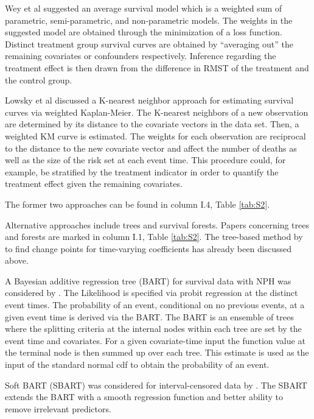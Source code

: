 \noindent 


\noindent Wey et al \cite{Wey.2016} suggested an average survival model which is a weighted sum of parametric, semi-parametric, and non-parametric models. The weights in the suggested model are obtained through the minimization of a loss function. Distinct treatment group survival curves are obtained by ``averaging out'' the remaining covariates or confounders respectively. Inference regarding the treatment effect is then drawn from the difference in RMST of the treatment and the control group.

\noindent Lowsky et al \cite{Lowsky.2013} discussed a K-nearest neighbor approach for estimating survival curves via weighted Kaplan-Meier. The K-nearest neighbors of a new observation are determined by its distance to the covariate vectors in the data set. Then, a weighted KM curve is estimated. The weights for each observation are reciprocal to the distance to the new covariate vector and affect the number of deaths as well as the size of the risk set at each event time. This procedure could, for example, be stratified by the treatment indicator in order to quantify the treatment effect given the remaining covariates.

\noindent The former two approaches can be found in column I.4, Table \ref{tab:S2}.

\noindent Alternative approaches include trees and survival forests. Papers concerning trees and forests are marked in column I.1, Table \ref{tab:S2}. The tree-based method by \cite{Xu.2002} to find change points for time-varying coefficients has already been discussed above. 

\noindent A Bayesian additive regression tree (BART) for survival data with NPH was considered by \cite{Sparapani.2016}. The Likelihood is specified via probit regression at the distinct event times. The probability of an event, conditional on no previous events, at a given event time is derived via the BART. The BART is an ensemble of trees where the splitting criteria at the internal nodes within each tree are set by the event time and covariates. For a given covariate-time input the function value at the terminal node is then summed up over each tree. This estimate is used as the input of the standard normal cdf to obtain the probability of an event.  

\noindent Soft BART (SBART) was considered for interval-censored data by \cite{Basak.2021}. The SBART extends the BART with a smooth regression function and better ability to remove irrelevant predictors.

